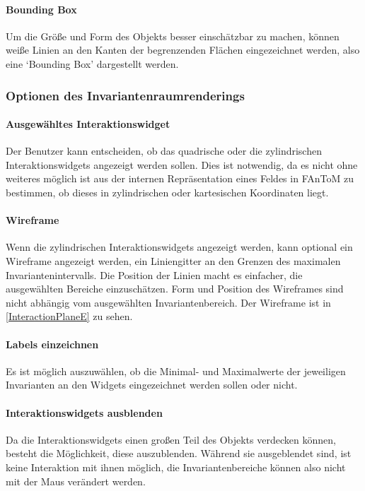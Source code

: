 \documentclass[a4paper,fontsize=12pt,toc=bib,halfparskip,ngerman]{scrartcl}
\begin{document}
\paragraph{Bounding Box}
Um die Gr\"o{\ss}e und Form des Objekts besser einsch\"atzbar zu machen, k\"onnen wei{\ss}e Linien an den Kanten der begrenzenden Fl\"achen eingezeichnet werden, also eine `Bounding Box' dargestellt werden.

\subsubsection{Optionen des Invariantenraumrenderings}
\label{sec:Options}

\paragraph{Ausgew\"ahltes Interaktionswidget}
Der Benutzer kann entscheiden, ob das quadrische oder die zylindrischen Interaktionswidgets angezeigt werden sollen. Dies ist notwendig, da es nicht ohne weiteres m\"oglich ist aus der internen Repr\"asentation eines Feldes in FAnToM zu bestimmen, ob dieses in zylindrischen oder kartesischen Koordinaten liegt.

\paragraph{Wireframe}
Wenn die zylindrischen Interaktionswidgets angezeigt werden, kann optional ein Wireframe angezeigt werden, ein Liniengitter an den Grenzen des maximalen Invariantenintervalls. Die Position der Linien macht es einfacher, die ausgew\"ahlten Bereiche einzusch\"atzen. Form und Position des Wireframes sind nicht abh\"angig vom ausgew\"ahlten Invariantenbereich. Der Wireframe ist in \cref{InteractionPlaneE} zu sehen.

\paragraph{Labels einzeichnen}
Es ist m\"oglich auszuw\"ahlen, ob die Minimal- und Maximalwerte der jeweiligen Invarianten an den Widgets eingezeichnet werden sollen oder nicht.

\paragraph{Interaktionswidgets ausblenden}
Da die Interaktionswidgets einen gro{\ss}en Teil des Objekts verdecken k\"onnen, besteht die M\"oglichkeit, diese auszublenden. W\"ahrend sie ausgeblendet sind, ist keine Interaktion mit ihnen m\"oglich, die Invariantenbereiche k\"onnen also nicht mit der Maus ver\"andert werden.
\end{document}
